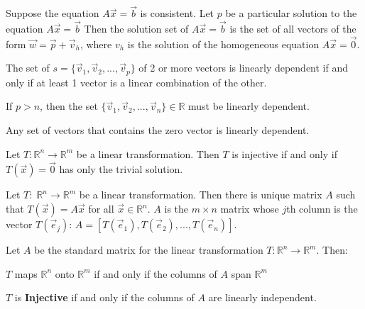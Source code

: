 \documentclass[5pt]{article}
\begin{document}
\begin{multicols}{2}
\begin{theorem}
  Suppose the equation $A\vec{x}=\vec{b}$ is consistent. Let $p$ be a particular solution to the equation $A\vec{x}=\vec{b}$ 
  Then the solution set of $A\vec{x}=\vec{b}$ is the set of all vectors of the form $\vec{w}=\vec{p}+\vec{v}_h$,
  where $v_h$ is the solution of the homogeneous equation $A\vec{x}=\vec{0}$.
\end{theorem}

\begin{theorem}
  The set of  $s=\{\vec{v}_1,\vec{v}_2, ... ,\vec{v}_p\}$ of 2 or more vectors 
  is linearly dependent if and only if at least 1 vector is a linear combination 
  of the other.
\end{theorem}

\begin{theorem}
  If $p>n$, then the set $\{\vec{v}_1, \vec{v}_2, ..., \vec{v}_n\}\in\mathbb{R}$ 
  must be linearly dependent.
\end{theorem}

\begin{theorem}
  Any set of vectors that contains the zero vector is linearly dependent.
\end{theorem}

\begin{theorem}
  Let $T:\mathbb{R}^n\rightarrow\mathbb{R}^m$ be a linear transformation. Then $T$ 
  is injective if and only if $T(\vec{x})=\vec{0}$ has only the trivial solution.
\end{theorem}

\begin{theorem}
  Let $T:\;\mathbb{R}^n\rightarrow\mathbb{R}^m$ be a linear transformation. Then there is unique matrix $A$ such that $T(\vec{x})=A\vec{x}$ for all $\vec{x}\in\mathbb{R}^n$.
  $A$ is the $m\times n$ matrix whose $j$th column is the vector $T(\vec{e}_j)$: $A=\left[T(\vec{e}_1), T(\vec{e}_2), ...,T(\vec{e}_n)\right]$.
\end{theorem}

\begin{theorem}
  Let $A$ be the standard matrix for the linear transformation $T:\mathbb{R}^n\rightarrow\mathbb{R}^m$. Then:
  \begin{itemize*}
    \item $T$ maps $\mathbb{R}^n$ onto $\mathbb{R}^m$ if and only if the columns of $A$ span $\mathbb{R}^m$
    \item $T$ is \textbf{Injective} if and only if the columns of $A$ are linearly independent.
  \end{itemize*}
\end{theorem}


\end{multicols}
\end{document}
